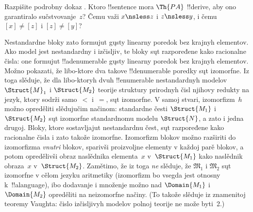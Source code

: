 \documentclass[../../../include/open-logic-section]{subfiles}
\begin{document}
\begin{prob}
Razpišite podrobny dokaz
. Ktoro !!{sentence} mora
$\Th{PA}$ !!{derive}, aby ono garantiralo sučstvovanje~$z$? Čemu važi
$x \nsless z$ i $z \nsless y$, i čemu $[x] \neq [z]$ i
$[z] \neq [y]$?
\end{prob}

\begin{explain}
Nestandardne bloky zato formujut gųsty linearny poredok bez krajnyh
elementov. Ako model jest nestandardny i izčisljiv, te bloky sųt razpoređene kako
racionalne čisla: one formujut !!a{denumerable} gųsty linearny poredok
bez krajnyh elementov. Možno pokazati, že libo-ktore dva takove
!!{denumerable} poredky sųt izomorfne. Iz toga slěduje, že dla
libo-ktoryh dvuh !!{enumerable} nestandardnyh modelov $\Struct{M}_1$ i
$\Struct{M_2}$ teorije struktury prirodnyh čisl njihovy redukty na
jezyk, ktory sodrži samo~$<$ i~$=$, sųt izomorfne. V samoj stvari,
izomorfizm~$h$ možno opreděliti slědujučim načinom: standardne česti
$\Struct{M_1}$ i $\Struct{M_2}$ sųt izomorfne standardnomu modelu
$\Struct{N}$, a zato i jedna drugoj. Bloky, ktore sostavljajut
nestandardnu čest, sųt razpoređene kako racionalne čisla i zato takože
izomorfne. Izomorfizm blokov možno razširiti do izomorfizma
\emph{vnutri} blokov, sparivši proizvoljne elementy v každoj parě
blokov, a potom opredělivši obraz naslědnika elementa~$x$
v~$\Struct{M_1}$ kako naslědnik obraza~$x$
v~$\Struct{M_2}$. Zamětimo, že iz toga
\emph{ne} slěduje, že $\mathfrak{M}_1$ i $\mathfrak{M}_2$ sųt
izomorfne v cělom jezyku aritmetiky (izomorfizm bo vsegda jest otnosny
k~!!a{language}), ibo dodavanje i množenje možno nad $\Domain{M_1}$ i
$\Domain{M_2}$ opreděliti na neizomorfne načiny. (To takože slěduje iz
znamenitoj teoremy Vaughta: čislo izčisljivyh modelov polnoj teorije ne
može byti~2.)
\end{explain}
\end{document}
